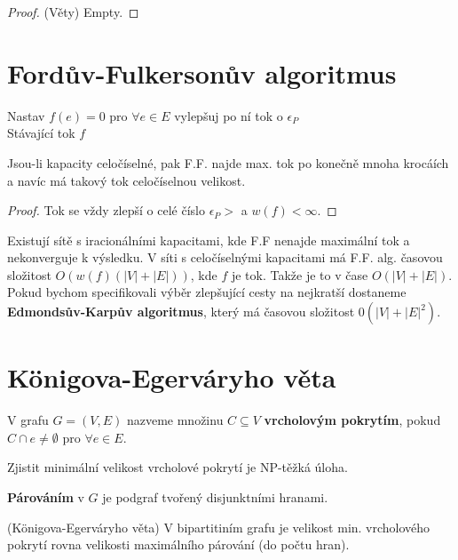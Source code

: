 \begin{proof} (Věty)
	Empty.
\end{proof}

\section{Fordův-Fulkersonův algoritmus}

\begin{algorithmic}[1]
	\State Nastav $f(e) = 0$ pro $\forall e \in E$
	\State  vylepšuj po ní tok o $\epsilon_P$
	\EndWhile\\
	\Return Stávající tok $f$
\end{algorithmic}

\begin{veta}[o celočíselnosti]
	Jsou-li kapacity celočíselné, pak F.F. najde max. tok po konečně mnoha krocáích a navíc má takový tok celočíselnou velikost.
\end{veta}

\begin{proof}
	Tok se vždy zlepší o celé číslo $\epsilon_P >$ a $w(f) < \infty$.
\end{proof}

Existují sítě s iracionálními kapacitami, kde F.F nenajde maximální tok a nekonverguje k výsledku. V síti s celočíselnými kapacitami má F.F. alg. časovou složitost $O(w(f)(|V|+|E|))$, kde $f$ je tok. Takže je to v čase $O(|V|+|E|)$. Pokud bychom specifikovali výběr zlepšující cesty na nejkratší dostaneme \textbf{Edmondsův-Karpův algoritmus}, který má časovou složitost $0(|V|+|E|^2)$.

\section{Königova-Egerváryho věta}

\begin{definice}
	V grafu $G = (V,E)$ nazveme množinu $C \subseteq V$ \textbf{vrcholovým pokrytím}, pokud $C \cap e \neq \emptyset$ pro $\forall e \in E$.
\end{definice}

Zjistit minimální velikost vrcholové pokrytí je NP-těžká úloha.

\begin{definice}
	\textbf{Párováním} v $G$ je podgraf tvořený disjunktními hranami.
\end{definice}

\begin{veta}(Königova-Egerváryho věta)
	V bipartitiním grafu je velikost min. vrcholového pokrytí rovna velikosti maximálního párování (do počtu hran).
\end{veta}


